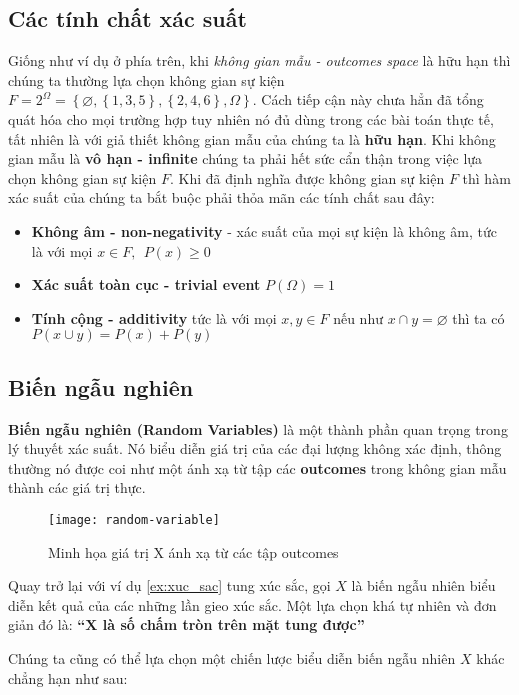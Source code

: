 \documentclass[../main-report.tex]{subfiles}
\begin{document}
\subsection{Các tính chất xác suất}
Giống như ví dụ ở phía trên, khi \textit{không gian mẫu - outcomes space} là hữu hạn thì chúng ta thường lựa chọn không gian sự kiện $F=2^{\Omega} = \left \{ \varnothing , \left \{ 1, 3, 5 \right \}, \left \{ 2, 4, 6 \right \}, \Omega \right \}$. Cách tiếp cận này chưa hẳn đã tổng quát hóa cho mọi trường hợp tuy nhiên nó đủ dùng trong các bài toán thực tế, tất nhiên là với giả thiết không gian mẫu của chúng ta là \textbf{hữu hạn}. Khi không gian mẫu là\textbf{ vô hạn - infinite} chúng ta phải hết sức cẩn thận trong việc lựa chọn không gian sự kiện $F$. Khi đã định nghĩa được không gian sự kiện $F$ thì hàm xác suất của chúng ta bắt buộc phải thỏa mãn các tính chất sau đây:

\begin{itemize}
\item \textbf{Không âm - non-negativity} - xác suất của mọi sự kiện là không âm, tức là với mọi $x \in F,~~ P(x)\geq 0$
\item \textbf{Xác suất toàn cục - trivial event} $P(\Omega) = 1$
\item \textbf{Tính cộng - additivity} tức là với mọi $x, y \in F$ nếu như $x\cap y= \varnothing$ thì ta có $P(x\cup y) = P(x) + P(y)$
\end{itemize}

\subsection{Biến ngẫu nghiên}
\textbf{Biến ngẫu nghiên (Random Variables)} là một thành phần quan trọng trong lý thuyết xác suất. Nó biểu diễn giá trị của các đại lượng không xác định, thông thường nó được coi như một ánh xạ từ tập các \textbf{outcomes} trong không gian mẫu thành các giá trị thực.

\begin{figure}[ht!]
\centering\texttt{[image: random-variable]}
\caption{Minh họa giá trị X ánh xạ từ các tập outcomes}
\end{figure}

Quay trở lại với ví dụ \ref{ex:xuc_sac} tung xúc sắc, gọi $X$ là biến ngẫu nhiên biểu diễn kết quả của các những lần gieo xúc sắc. Một lựa chọn khá tự nhiên và đơn giản đó là: \textbf{``$\boldsymbol{X}$ là số chấm tròn trên mặt tung được''}

Chúng ta cũng có thể lựa chọn một chiến lược biểu diễn biến ngẫu nhiên $X$ khác chẳng hạn như sau:
\end{document}
